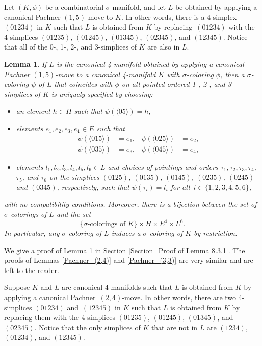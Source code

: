 \documentclass[a4paper, oneside]{amsart}
\numberwithin{equation}{subsection}
\theoremstyle{referencedlemma}
\theoremstyle{plain} %
\newtheorem{lem}[equation]{Lemma}
\theoremstyle{remark}
\begin{document}
Let $(K, \phi)$ be a combinatorial $\sigma$-manifold, and let $L$ be obtained by applying a canonical Pachner $(1,5)$-move to $K$.  In other words, there is a 4-simplex $(01234)$ in $K$ such that $L$ is obtained from $K$ by replacing~$(01234)$ with the 4-simplices $(01235)$, $(01245)$, $(01345)$, $(02345)$,  and $(12345)$. Notice that all of the 0-, 1-, 2-, and 3-simplices of $K$ are also in $L$.  

\begin{lem}\label{Pachner_(1,5)}
If $L$ is the canonical 4-manifold obtained by applying a canonical Pachner $(1,5)$-move to a canonical 4-manifold $K$ with $\sigma$-coloring $\phi$, then a $\sigma$-coloring $\psi$ of $L$ that coincides with $\phi$ on all pointed ordered 1-, 2-, and 3-simplices of $K$ is uniquely specified by choosing:
\begin{itemize}
\item an element $h\in H$ such that $\psi(\langle 05\rangle) = h$,
\item elements $e_1, e_2, e_3, e_4 \in E$ such that 
\begin{align*}
\psi(\langle 015\rangle) &= e_1, &
\psi(\langle 025\rangle ) &= e_2,\\
\psi(\langle 035\rangle ) &= e_3, &
\psi(\langle 045\rangle ) &= e_4,
\end{align*}
\item elements $l_1, l_2, l_3, l_4, l_5, l_6\in L$ and choices of pointings and orders $\tau_1, \tau_2, \tau_3, \tau_4$,  $\tau_5$, and $\tau_6$ on the simplices $(0125)$, $(0135)$, $(0145)$,  $(0235)$,  $(0245)$ and $(0345)$, respectively, such that $\psi(\tau_i) = l_i$ for all~$i\in \{1,2, 3, 4, 5, 6\}$,
\end{itemize}
with no compatibility conditions. Moreover, there is a bijection between the set of $\sigma$-colorings of $L$ and the set
\[
\{ \text{$\sigma$-colorings of $K$}\}\times H\times E^4\times L^6.
\]
In particular, any $\sigma$-coloring of $L$ induces a $\sigma$-coloring of $K$ by restriction.
\end{lem}

We give a proof of Lemma \ref{Pachner_(1,5)} in Section \ref{Section_Proof of Lemma 8.3.1}. The proofs of Lemmas \ref{Pachner_(2,4)} and \ref{Pachner_(3,3)} are very similar and are left to the reader. 

Suppose $K$ and $L$ are canonical 4-manifolds such that $L$ is obtained from $K$ by applying a canonical Pachner~$(2,4)$-move.  In other words, there are two 4-simplices $(01234)$ and~$(12345)$ in $K$ such that $L$ is obtained from $K$ by replacing them with the 4-simplices $(01235)$, $(01245)$, $(01345)$, and~$(02345)$.  Notice that the only simplices of $K$ that are not in $L$ are $(1234)$, $(01234)$, and $(12345)$. 
\end{document}
